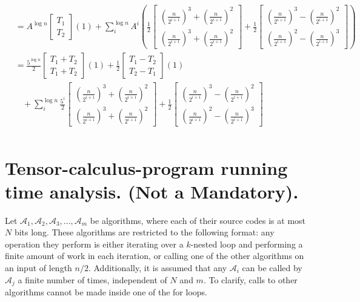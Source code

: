 \begin{equation*}
\begin{split}
     & = A^{\log n} \begin{bmatrix}
       T_{1} \\
       T_{2} 
     \end{bmatrix}(1) +\sum_{i}^{\log n}{ A^{i} \left( \frac{1}{2}\begin{bmatrix}
       \left(\frac{n}{2^{i+1}}\right)^{3} +  \left(\frac{n}{2^{i+1}}\right)^{2}\\
       \left(\frac{n}{2^{i+1}}\right)^{3} +  \left(\frac{n}{2^{i+1}}\right)^{2} 
     \end{bmatrix}+ \frac{1}{2}\begin{bmatrix}
       \left(\frac{n}{2^{i+1}}\right)^{3} -  \left(\frac{n}{2^{i+1}}\right)^{2}\\
        \left(\frac{n}{2^{i+1}}\right)^{2} -\left(\frac{n}{2^{i+1}}\right)^{3} 
    \end{bmatrix} \right)} \\ 
    & = \frac{5^{\log n}}{2} \begin{bmatrix}
      T_{1} + T_{2}\\
      T_{1} + T_{2} 
     \end{bmatrix}(1) + \frac{1}{2} \begin{bmatrix}
       T_{1} - T_{2}\\
       T_{2} -T_{1}
     \end{bmatrix}(1) \\ 
     & \ \ \ \ +\sum_{i}^{\log n}{  \frac{5^{i}}{2}\begin{bmatrix}
       \left(\frac{n}{2^{i+1}}\right)^{3} +  \left(\frac{n}{2^{i+1}}\right)^{2}\\
       \left(\frac{n}{2^{i+1}}\right)^{3} +  \left(\frac{n}{2^{i+1}}\right)^{2} 
     \end{bmatrix}+ \frac{1}{2}\begin{bmatrix}
       \left(\frac{n}{2^{i+1}}\right)^{3} -  \left(\frac{n}{2^{i+1}}\right)^{2}\\
        \left(\frac{n}{2^{i+1}}\right)^{2} -\left(\frac{n}{2^{i+1}}\right)^{3} 
    \end{bmatrix}} \\ 
   \end{split}
 \end{equation*}
\fi 
\fi 

  \section{Tensor-calculus-program running time analysis. (Not a Mandatory).}
Let $\mathcal{A}_{1},\mathcal{A}_{2},\mathcal{A}_{3},...,\mathcal{A}_{m}$ be algorithms, where each of their source codes is at most $N$ bits long. These algorithms are restricted to the following format: any operation they perform is either iterating over a $k$-nested loop and performing a finite amount of work in each iteration, or calling one of the other algorithms on an input of length $n/2$. Additionally, it is assumed that any $\mathcal{A}_{i}$ can be called by $\mathcal{A}_{j}$ a finite number of times, independent of $N$ and $m$. To clarify, calls to other algorithms cannot be made inside one of the for loops.


